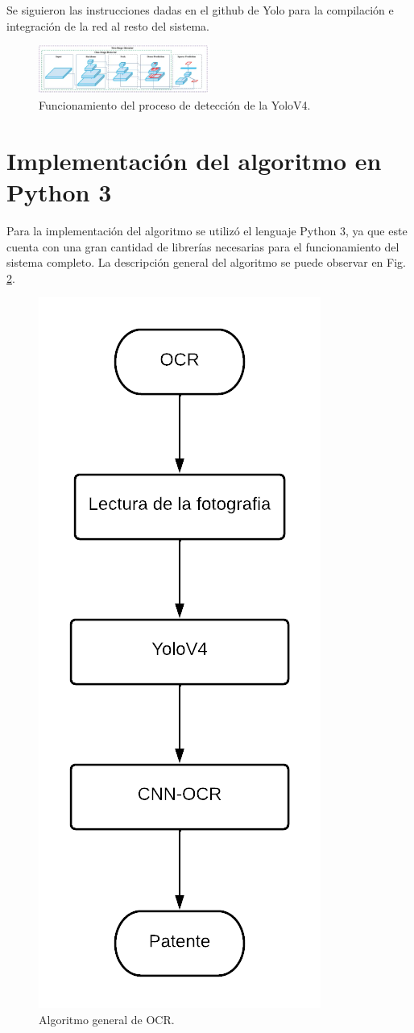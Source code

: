Se siguieron las instrucciones dadas en el github de Yolo para la compilación e integración de la red al resto del sistema. 


\begin{figure}
    \centering
    \includegraphics[width=0.5\textwidth]{imgs/funcionamiento-yolo.png}
    \caption{Funcionamiento del proceso de detección de la YoloV4.}
    \label{fig:funcionamiento-yolo}
\end{figure}



\section{Implementación del algoritmo en Python 3}

Para la implementación del algoritmo se utilizó el lenguaje Python 3, ya que este cuenta con una gran cantidad de librerías necesarias para el funcionamiento del sistema completo. La descripción general del algoritmo se puede observar en Fig. \ref{fig:algoritmo-ocr}.

\begin{figure}
    \centering
    \includegraphics[width=.25\textwidth]{imgs/flujo-algoritmo-ocr.png}
    \caption{Algoritmo general de OCR.}
    \label{fig:algoritmo-ocr}
\end{figure}

